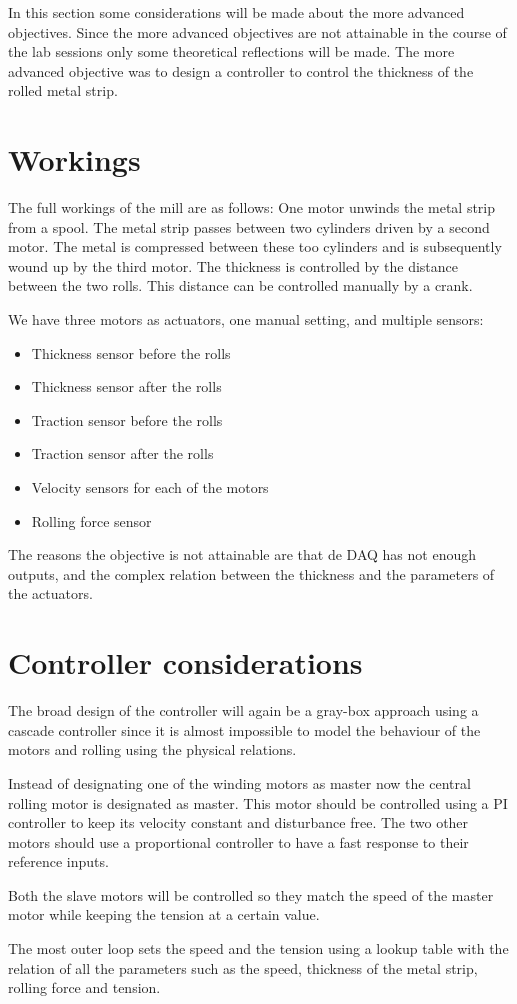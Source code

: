 In this section some considerations will be made about the more advanced objectives. Since the more advanced objectives are not attainable in the course of the lab sessions only some theoretical reflections will be made. The more advanced objective was to design a controller to control the thickness of the rolled metal strip.

\section{Workings}
The full workings of the mill are as follows: One motor unwinds the metal strip from a spool. The metal strip passes between two cylinders driven by a second motor. The metal is compressed between these too cylinders and is subsequently wound up by the third motor. The thickness is controlled by the distance between the two rolls. This distance can be controlled manually by a crank.

We have three motors as actuators, one manual setting, and multiple sensors: 
\begin{itemize}
\item Thickness sensor before the rolls
\item Thickness sensor after the rolls
\item Traction sensor before the rolls
\item Traction sensor after the rolls
\item Velocity sensors for each of the motors
\item Rolling force sensor
\end{itemize}

The reasons the objective is not attainable are that de DAQ has not enough outputs, and the complex relation between the thickness and the parameters of the actuators.

\section{Controller considerations}

The broad design of the controller will again be a gray-box approach using a cascade controller since it is almost impossible to model the behaviour of the motors and rolling using the physical relations.

Instead of designating one of the winding motors as master now the central rolling motor is designated as master. This motor should be controlled using a PI controller to keep its velocity constant and disturbance free. The two other motors should use a proportional controller to have a fast response to their reference inputs.

Both the slave motors will be controlled so they match the speed of the master motor while keeping the tension at a certain value.

The most outer loop sets the speed and the tension using a lookup table with the relation of all the parameters such as the speed, thickness of the metal strip, rolling force and tension. 








